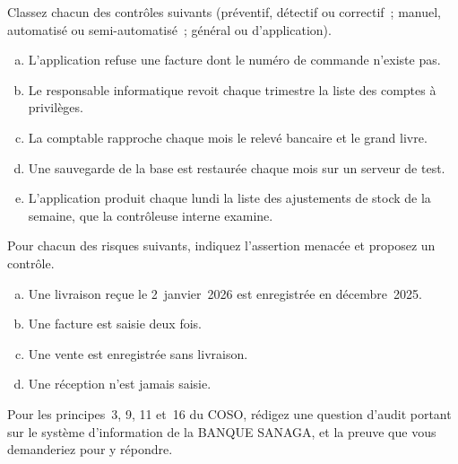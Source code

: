 \begin{boxexo}[title={\ding{45}\quad Exercice~3.1. Classer des contrôles \niveaubase}]
Classez chacun des contrôles suivants (préventif, détectif ou correctif~;
manuel, automatisé ou semi-automatisé~; général ou d'application).
\begin{enumerate}[(a)]
    \item L'application refuse une facture dont le numéro de commande
          n'existe pas.
    \item Le responsable informatique revoit chaque trimestre la liste des
          comptes à privilèges.
    \item La comptable rapproche chaque mois le relevé bancaire et le grand
          livre.
    \item Une sauvegarde de la base est restaurée chaque mois sur un serveur
          de test.
    \item L'application produit chaque lundi la liste des ajustements de
          stock de la semaine, que la contrôleuse interne examine.
\end{enumerate}
\end{boxexo}

\begin{boxexo}[title={\ding{45}\quad Exercice~3.2. Les assertions \niveaubase}]
Pour chacun des risques suivants, indiquez l'assertion menacée et proposez
un contrôle.
\begin{enumerate}[(a)]
    \item Une livraison reçue le 2~janvier~2026 est enregistrée en
          décembre~2025.
    \item Une facture est saisie deux fois.
    \item Une vente est enregistrée sans livraison.
    \item Une réception n'est jamais saisie.
\end{enumerate}
\end{boxexo}

\begin{boxexo}[title={\ding{45}\quad Exercice~3.3. Le COSO et le SI \niveaumoyen}]
Pour les principes~3, 9, 11 et~16 du COSO, rédigez une question d'audit
portant sur le système d'information de la BANQUE SANAGA, et la preuve que
vous demanderiez pour y répondre.
\end{boxexo}

